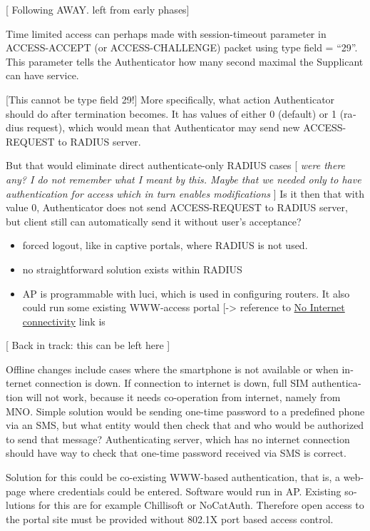 \documentclass[12pt,a4paper,english]{tutthesis}
\begin{document}
\begin{otherlanguage}{english}
[ Following AWAY. left from early phases]

Time limited access can perhaps made with session-timeout parameter
in ACCESS-ACCEPT (or ACCESS-CHALLENGE) packet using type field = ``29''.
This parameter tells the Authenticator how many second maximal the Supplicant
can have service. 

[This cannot be type field 29!]  More specifically, what action
Authenticator should do after termination becomes. It has values of
either 0 (default) or 1 (radius request), which would mean that
Authenticator may send new ACCESS-REQUEST to RADIUS server.

But that would eliminate direct authenticate-only RADIUS cases
  [ \emph{were there}
 \emph{any? I do not remember what I meant}
 \emph{by this. Maybe that we needed only}
 \emph{to have authentication for access} 
 \emph{which in turn enables modifications} ]
Is it then that with value 0, Authenticator does not send
ACCESS-REQUEST to RADIUS server, but client still can automatically send it without 
user's acceptance?
\begin{itemize}
\item forced logout, like in captive portals, where RADIUS is not used.
\item no straightforward solution exists within RADIUS
\item AP is programmable with luci, which is used in configuring routers. It also could run some existing WWW-access
portal [-> reference to \hyperref[text:nointernet]{No Internet connectivity} link is
\end{itemize}








[ Back in track: this can be left here ]

Offline changes include cases where the smartphone is not available
 or when internet connection is down.
If connection to internet is down, full SIM authentication will not
work, because it needs co-operation from internet, namely from MNO.
Simple solution would be sending one-time password to a predefined
phone via an SMS, but what entity would then check that and who would
be authorized to send that message?
Authenticating server, which has no internet connection should 
have way to check that one-time password received via SMS is correct.

Solution for this could be co-existing WWW-based authentication, that
is, a web-page where credentials could be entered.
Software would run in AP. Existing solutions for this are for example
Chillisoft or NoCatAuth. 
Therefore open access to the portal site must be provided without
802.1X port based access control.



\end{otherlanguage}
\end{document}
